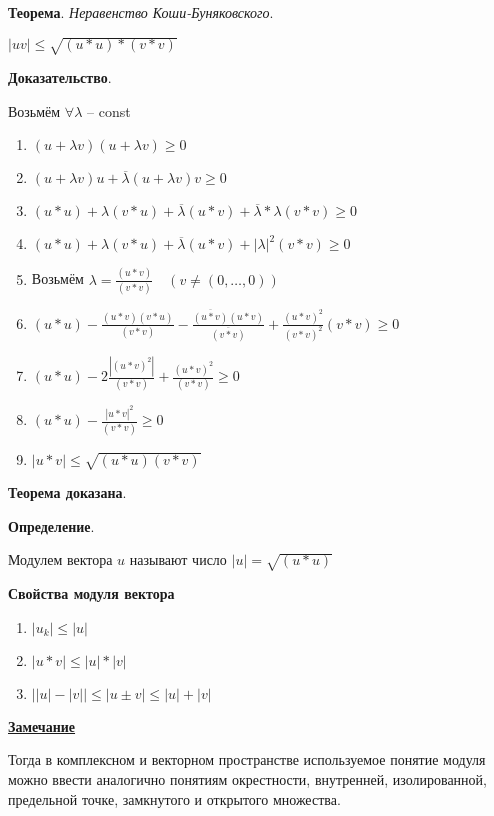 \documentclass{article}
\begin{document}
\textbf{Теорема}. \textit{Неравенство Коши-Буняковского}.

$|u v| \le \sqrt{(u * u) * (v * v)}$

\textbf{Доказательство}.

Возьмём $\forall \lambda $ -- const

\begin{enumerate}
    \item $(u + \lambda v) (u + \lambda v) \ge 0$
    \item $(u + \lambda v) u + \overline{\lambda} (u + \lambda v) v \ge 0$
    \item $(u * u) + \lambda (v * u) + \overline{\lambda} (u * v) + \overline{\lambda} * \lambda (v * v) \ge 0$
    \item $(u * u) + \lambda (v * u) + \overline{\lambda} (u * v) + |\lambda|^2 (v * v) \ge 0$
    \item Возьмём $\lambda = \frac{(u * v)}{(v * v)} \quad (v \neq (0, \dots, 0))$
    \item $(u * u) - \frac{(u * v) (v * u)}{(v * v)} - \frac{\overline{(u * v)} (u * v)}{\overline{(v * v)}}
    + \frac{(u * v)^2}{(v * v)^2} (v * v) \ge 0$
    \item $(u * u) - 2 \frac{|(u * v)^2|}{(v * v)} + \frac{(u * v)^2}{(v * v)} \ge 0$
    \item $(u * u) - \frac{|u * v|^2}{(v * v)} \ge 0$
    \item $|u * v| \le \sqrt{(u * u) (v * v)}$
\end{enumerate}

\textbf{Теорема доказана}.

\textbf{Определение}.

Модулем вектора $u$ называют число $|u| = \sqrt{(u * u)}$

\textbf{Свойства модуля вектора}

\begin{enumerate}
    \item $|u_k| \le |u|$
    \item $|u * v| \le |u| * |v|$
    \item $\big||u| - |v|\big| \le |u \pm v| \le |u| + |v|$
\end{enumerate}

\underline{\textbf{Замечание}}

Тогда в комплексном и векторном пространстве используемое понятие модуля
можно ввести аналогично понятиям окрестности, внутренней, изолированной,
предельной точке, замкнутого и открытого множества.
\end{document}
